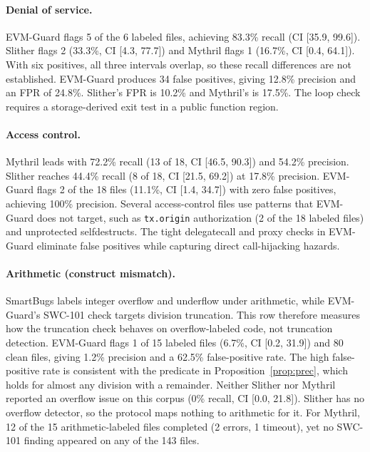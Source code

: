 \documentclass[pdflatex,sn-mathphys]{sn-jnl}
\theoremstyle{thmstyleone}
\theoremstyle{thmstyletwo}
\begin{document}
\paragraph{Denial of service.} EVM-Guard flags 5 of the 6 labeled files, achieving 83.3\% recall (CI [35.9, 99.6]). Slither flags 2 (33.3\%, CI [4.3, 77.7]) and Mythril flags 1 (16.7\%, CI [0.4, 64.1]). With six positives, all three intervals overlap, so these recall differences are not established. EVM-Guard produces 34 false positives, giving 12.8\% precision and an FPR of 24.8\%. Slither's FPR is 10.2\% and Mythril's is 17.5\%. The loop check requires a storage-derived exit test in a public function region.

\paragraph{Access control.} Mythril leads with 72.2\% recall (13 of 18, CI [46.5, 90.3]) and 54.2\% precision. Slither reaches 44.4\% recall (8 of 18, CI [21.5, 69.2]) at 17.8\% precision. EVM-Guard flags 2 of the 18 files (11.1\%, CI [1.4, 34.7]) with zero false positives, achieving 100\% precision. Several access-control files use patterns that EVM-Guard does not target, such as \texttt{tx.origin} authorization (2 of the 18 labeled files) and unprotected selfdestructs. The tight delegatecall and proxy checks in EVM-Guard eliminate false positives while capturing direct call-hijacking hazards.

\paragraph{Arithmetic (construct mismatch).}\label{sec:results:arith} SmartBugs labels integer overflow and underflow under arithmetic, while EVM-Guard's SWC-101 check targets division truncation. This row therefore measures how the truncation check behaves on overflow-labeled code, not truncation detection. EVM-Guard flags 1 of 15 labeled files (6.7\%, CI [0.2, 31.9]) and 80 clean files, giving 1.2\% precision and a 62.5\% false-positive rate. The high false-positive rate is consistent with the predicate in Proposition~\ref{prop:prec}, which holds for almost any division with a remainder. Neither Slither nor Mythril reported an overflow issue on this corpus (0\% recall, CI [0.0, 21.8]). Slither has no overflow detector, so the protocol maps nothing to arithmetic for it. For Mythril, 12 of the 15 arithmetic-labeled files completed (2 errors, 1 timeout), yet no SWC-101 finding appeared on any of the 143 files.
\end{document}
